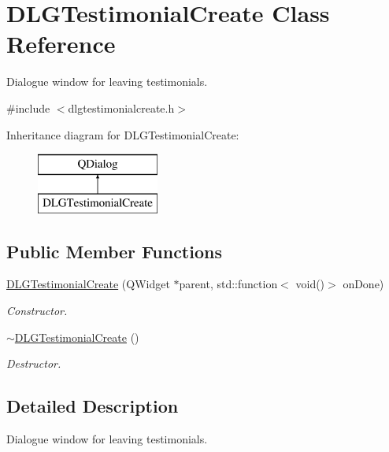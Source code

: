\hypertarget{class_d_l_g_testimonial_create}{}\section{D\+L\+G\+Testimonial\+Create Class Reference}
\label{class_d_l_g_testimonial_create}


Dialogue window for leaving testimonials.  




{\ttfamily \#include $<$dlgtestimonialcreate.\+h$>$}

Inheritance diagram for D\+L\+G\+Testimonial\+Create\+:\begin{figure}[H]
\begin{center}
\leavevmode
\includegraphics[height=2.000000cm]{class_d_l_g_testimonial_create}
\end{center}
\end{figure}
\subsection*{Public Member Functions}
\begin{DoxyCompactItemize}
\item 
\mbox{\hyperlink{class_d_l_g_testimonial_create_a8273e7c08f467690691ef80452923474}{D\+L\+G\+Testimonial\+Create}} (Q\+Widget $\ast$parent, std\+::function$<$ void()$>$ on\+Done)
\begin{DoxyCompactList}\small\item\em Constructor. \end{DoxyCompactList}\item 
\mbox{\hyperlink{class_d_l_g_testimonial_create_a8dcbb8630fee3de61526f8986bb4d58e}{$\sim$\+D\+L\+G\+Testimonial\+Create}} ()
\begin{DoxyCompactList}\small\item\em Destructor. \end{DoxyCompactList}\end{DoxyCompactItemize}


\subsection{Detailed Description}
Dialogue window for leaving testimonials. 




